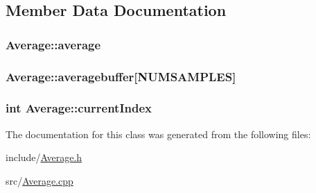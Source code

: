 \subsection{Member Data Documentation}
\hypertarget{classAverage_abcc8a32d2c44c97a84c10f5e093e6937}{
\subsubsection[{average}]{ Average\-::average\hspace{0.3cm}{\ttfamily [private]}}}\label{classAverage_abcc8a32d2c44c97a84c10f5e093e6937}
\hypertarget{classAverage_af3b416d3fd5e90e06467a37e9dcb86e1}{
\subsubsection[{averagebuffer}]{ Average\-::averagebuffer\mbox{[}{\bf N\-U\-M\-S\-A\-M\-P\-L\-E\-S}\mbox{]}\hspace{0.3cm}{\ttfamily [private]}}}\label{classAverage_af3b416d3fd5e90e06467a37e9dcb86e1}
\hypertarget{classAverage_acf70c3e32bfe44e11d20382f0015733e}{
\subsubsection[{current\-Index}]{\setlength{\rightskip}{0pt plus 5cm}int Average\-::current\-Index\hspace{0.3cm}{\ttfamily [private]}}}\label{classAverage_acf70c3e32bfe44e11d20382f0015733e}


The documentation for this class was generated from the following files\-:\begin{DoxyCompactItemize}
\item 
include/\hyperlink{Average_8h}{Average.\-h}\item 
src/\hyperlink{Average_8cpp}{Average.\-cpp}\end{DoxyCompactItemize}
